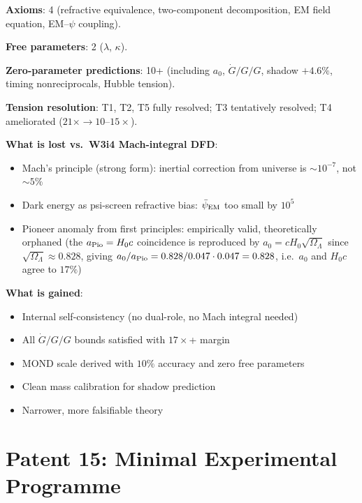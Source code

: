 \documentclass[11pt]{article}
\newcommand{\psiEM}{\bar{\psi}_{\rm EM}}
\newcommand{\Gdot}{\dot{G}/G}
\newcommand{\aM}{a_0}
\newcommand{\Hzero}{H_0}
\begin{document}
\begin{tcolorbox}[colback=blue!5!white, colframe=blue!60!black,
  title=\textbf{The Canonical Two-Component DFD: Summary Card}]

\textbf{Axioms}: 4 (refractive equivalence, two-component decomposition,
EM field equation, EM--$\psi$ coupling).

\textbf{Free parameters}: 2 ($\lambda$, $\kappa$).

\textbf{Zero-parameter predictions}: 10+ (including $\aM$, $\Gdot/G$,
shadow $+4.6\%$, timing nonreciprocals, Hubble tension).

\textbf{Tension resolution}: T1, T2, T5 fully resolved; T3 tentatively
resolved; T4 ameliorated ($21\times \to 10$--$15\times$).

\textbf{What is lost vs.\ W3i4 Mach-integral DFD}:
\begin{itemize}[nosep]
\item Mach's principle (strong form): inertial correction from universe
  is $\sim 10^{-7}$, not $\sim 5\%$
\item Dark energy as psi-screen refractive bias: $\psiEM$ too small by $10^5$
\item Pioneer anomaly from first principles: empirically valid, theoretically
  orphaned (the $a_{\rm Pio} = \Hzero c$ coincidence is reproduced by
  $\aM = c\Hzero\sqrt{\Omega_\Lambda}$ since $\sqrt{\Omega_\Lambda}
  \approx 0.828$, giving $a_0/a_{\rm Pio} = 0.828/0.047 \cdot 0.047
  = 0.828$, i.e.\ $\aM$ and $\Hzero c$ agree to $17\%$)
\end{itemize}

\textbf{What is gained}:
\begin{itemize}[nosep]
\item Internal self-consistency (no dual-role, no Mach integral needed)
\item All $\Gdot/G$ bounds satisfied with $17\times$+ margin
\item MOND scale derived with $10\%$ accuracy and zero free parameters
\item Clean mass calibration for shadow prediction
\item Narrower, more falsifiable theory
\end{itemize}
\end{tcolorbox}

\newpage

\part{Patent 15: Minimal Experimental Programme}
\label{part:P15}
\end{document}
